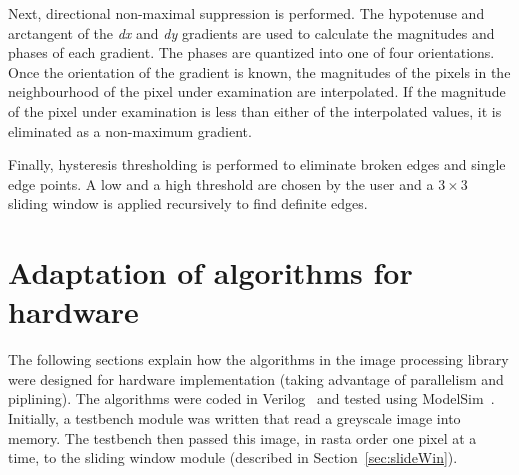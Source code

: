 \documentclass[10pt,twocolumn,letterpaper]{article}
\begin{document}
Next, directional non-maximal suppression is performed.
The hypotenuse and arctangent of the \emph{dx} and \emph{dy} gradients 
are used to calculate the magnitudes and phases of each gradient.
The phases are quantized into one of four orientations. 
Once the orientation of the gradient is known, the magnitudes of the pixels in
the neighbourhood of the pixel under examination are interpolated. If the magnitude of the pixel under examination is less
than either of the interpolated values, it is eliminated as a non-maximum gradient. 

Finally, hysteresis thresholding is performed to eliminate broken edges and single edge points.
A low and a high threshold are chosen by the user and 
a $3\times3$ sliding window is applied recursively to find definite edges.


\section{Adaptation of algorithms for hardware}
The following sections explain how the algorithms in the image processing library were designed for
hardware implementation (taking advantage of parallelism and piplining). The algorithms were
coded in Verilog~\cite{thomasVerilog} and tested using ModelSim~\cite{modelsim}.
Initially, a testbench module was written that read a greyscale image 
into memory. The testbench then passed this image, in rasta order one pixel at a time, 
to the sliding window module (described in Section~\ref{sec:slideWin}).
\end{document}

